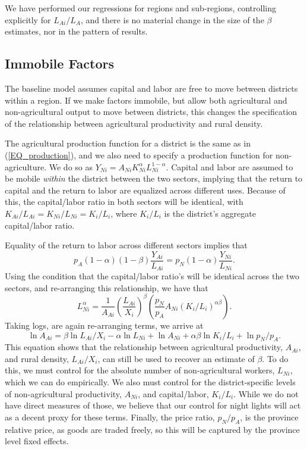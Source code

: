 \documentclass[11pt]{article}
\begin{document}
We have performed our regressions for regions and sub-regions, controlling explicitly for $L_{Ai}/L_A$, and there is no material change in the size of the $\beta$ estimates, nor in the pattern of results. 

\subsection{Immobile Factors}
The baseline model assumes capital and labor are free to move between districts within a region. If we make factors immobile, but allow both agricultural and non-agricultural output to move between districts, this changes the specification of the relationship between agricultural productivity and rural density. 

The agricultural production function for a district is the same as in (\ref{EQ_production}), and we also need to specify a production function for non-agriculture. We do so as $Y_{Ni} = A_{Ni} K_{Ni}^{\alpha} L_{Ni}^{1-\alpha}$. Capital and labor are assumed to be mobile \textit{within} the district between the two sectors, implying that the return to capital and the return to labor are equalized across different uses. Because of this, the capital/labor ratio in both sectors will be identical, with $K_{Ai}/L_{Ai} = K_{Ni}/L_{Ni} = K_i/L_i$, where $K_i/L_i$ is the district's aggregate capital/labor ratio. 

Equality of the return to labor across different sectors implies that 
\begin{equation}
	p_A (1-\alpha)(1-\beta)\frac{Y_{Ai}}{L_{Ai}} = p_N (1-\alpha)\frac{Y_{Ni}}{L_{Ni}}. 
\end{equation}
Using the condition that the capital/labor ratio's will be identical across the two sectors, and re-arranging this relationship, we have that
\begin{equation}
	L_{Ni}^{\alpha} = \frac{1}{A_{Ai}}\left(\frac{L_{Ai}}{X_i}\right)^{\beta} \left(\frac{p_N}{p_A} A_{Ni}(K_i/L_i)^{\alpha\beta} \right).
\end{equation}
Taking logs, are again re-arranging terms, we arrive at
\begin{equation}
	\ln A_{Ai} = \beta \ln L_{Ai}/X_i - \alpha \ln L_{Ni} + \ln A_{Ni} + \alpha\beta \ln K_i/L_i + \ln p_N/p_A.
\end{equation}
This equation shows that the relationship between agricultural productivity, $A_{Ai}$, and rural density, $L_{Ai}/X_i$, can still be used to recover an estimate of $\beta$. To do this, we must control for the absolute number of non-agricultural workers, $L_{Ni}$, which we can do empirically. We also must control for the district-specific levels of non-agricultural productivity, $A_{Ni}$, and capital/labor, $K_i/L_i$. While we do not have direct measures of those, we believe that our control for night lights will act as a decent proxy for these terms. Finally, the price ratio, $p_N/p_A$, is the province relative price, as goods are traded freely, so this will be captured by the province level fixed effects.
\end{document}
